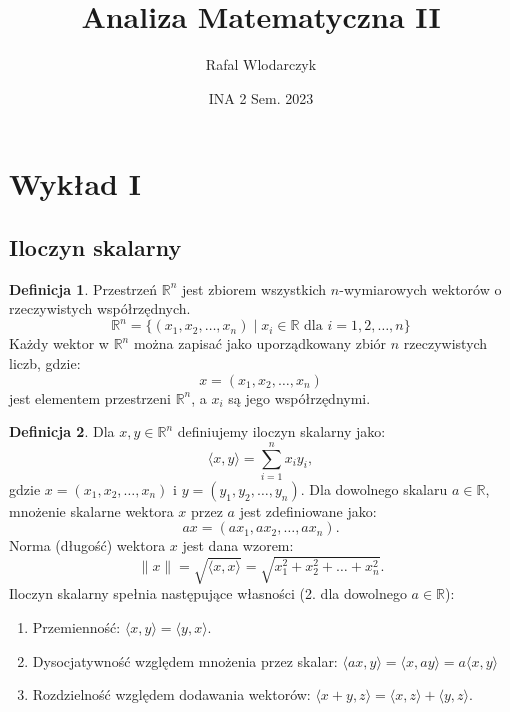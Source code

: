 \documentclass{article}
\author{Rafal Wlodarczyk}
\title{Analiza Matematyczna II}
\date{INA 2 Sem. 2023}
\theoremstyle{definition}
\newtheorem{de}{Definicja}[subsection]
\theoremstyle{definition}
\theoremstyle{definition}
\theoremstyle{definition}
\theoremstyle{definition}
\theoremstyle{definition}
\theoremstyle{definition}
\begin{document}
\maketitle

\tableofcontents

\section{Wykład I}

\subsection{Iloczyn skalarny}

\begin{de}
    Przestrzeń \(\mathbb{R}^n\) jest zbiorem wszystkich \(n\)-wymiarowych wektorów o rzeczywistych współrzędnych.
    \[
    \mathbb{R}^n = \{ (x_1, x_2, \dots, x_n) \mid x_i \in \mathbb{R} \text{ dla } i = 1, 2, \dots, n \}
    \]
    Każdy wektor w \(\mathbb{R}^n\) można zapisać jako uporządkowany zbiór \(n\) rzeczywistych liczb, gdzie:
    \[
    x = (x_1, x_2, \dots, x_n)
    \]
    jest elementem przestrzeni \(\mathbb{R}^n\), a \(x_i\) są jego współrzędnymi.
\end{de}

\begin{de}
    Dla \(x, y \in \mathbb{R}^n\) definiujemy iloczyn skalarny jako:
    \begin{equation*}
        \langle x, y \rangle = \sum_{i=1}^{n} x_i y_i,
    \end{equation*}
    gdzie \( x = (x_1, x_2, \dots, x_n) \) i \( y = (y_1, y_2, \dots, y_n) \).
    Dla dowolnego skalaru \( a \in \mathbb{R} \), mnożenie skalarne wektora \( x \) przez \( a \) jest zdefiniowane jako:
    \[
        ax = (ax_1, ax_2, \dots, ax_n).
    \]
    Norma (długość) wektora \( x \) jest dana wzorem:
    \[
        \|x\| = \sqrt{\langle x, x \rangle} = \sqrt{x_1^2 + x_2^2 + \dots + x_n^2}.
    \]
    Iloczyn skalarny spełnia następujące własności (2. dla dowolnego \( a \in \mathbb{R} \)):
    \begin{enumerate}
        \item Przemienność: \(\langle x, y \rangle = \langle y, x \rangle\).
        \item Dysocjatywność względem mnożenia przez skalar: \(\langle ax, y \rangle = \langle x, ay \rangle = a \langle x, y \rangle\) 
        \item Rozdzielność względem dodawania wektorów: \(\langle x + y, z \rangle = \langle x, z \rangle + \langle y, z \rangle\).
    \end{enumerate}
\end{de}
\end{document}
